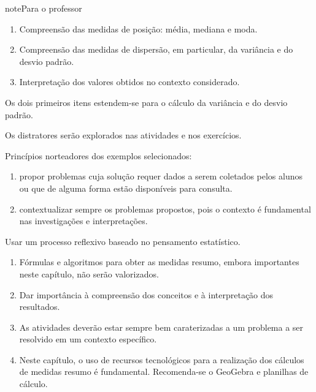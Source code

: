 \begin{sphinxadmonition}{note}{Para o professor}
\begin{enumerate}
\item {} 
Compreensão das medidas de posição: média, mediana e moda.

\item {} 
Compreensão das medidas de dispersão, em particular, da variância e do desvio padrão.

\item {} 
Interpretação dos valores obtidos no contexto considerado.

\end{enumerate}

Os dois primeiros itens estendem-se para o cálculo da variância e do desvio padrão.

Os distratores serão explorados nas atividades e nos exercícios.


Princípios norteadores dos exemplos selecionados:
\begin{enumerate}
\item {} 
propor problemas cuja solução requer dados a serem coletados pelos alunos ou que de alguma forma estão disponíveis para consulta.

\item {} 
contextualizar sempre os problemas propostos, pois o contexto é fundamental nas investigações e interpretações.

\end{enumerate}


Usar um processo reflexivo baseado no pensamento estatístico.
\begin{enumerate}
\item {} 
Fórmulas e algoritmos para obter as medidas resumo, embora importantes neste capítulo, não serão valorizados.

\item {} 
Dar importância à compreensão dos conceitos e à interpretação dos resultados.

\item {} 
As atividades deverão estar sempre bem caraterizadas a um problema a ser resolvido em um contexto específico.

\item {} 
Neste capítulo, o uso de recursos tecnológicos para a realização dos cálculos de medidas resumo é fundamental. Recomenda-se o GeoGebra e planilhas de cálculo.

\end{enumerate}


\end{sphinxadmonition}
